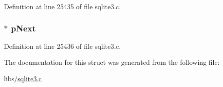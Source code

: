 Definition at line 25435 of file sqlite3.\+c.

\hypertarget{struct_unix_unused_fd_ade35b43b2b510ea525faaa27fcc29cc0}{}
\subsubsection[{p\+Next}]{$\ast$ p\+Next}\label{struct_unix_unused_fd_ade35b43b2b510ea525faaa27fcc29cc0}


Definition at line 25436 of file sqlite3.\+c.



The documentation for this struct was generated from the following file\+:\begin{DoxyCompactItemize}
\item 
libs/\hyperlink{sqlite3_8c}{sqlite3.\+c}\end{DoxyCompactItemize}

